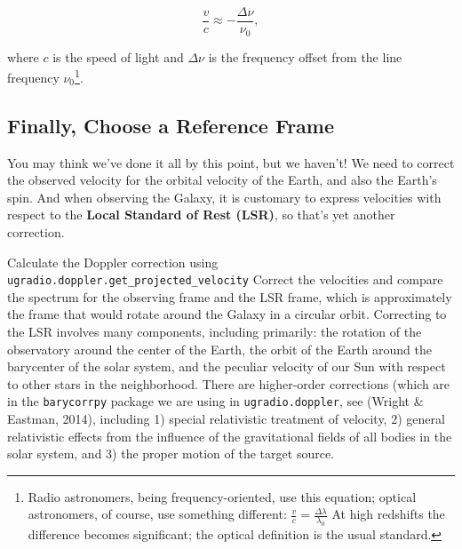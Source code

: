 \documentclass[11pt,preprint]{aastex}
\begin{document}
\begin{equation}
\frac{v}{c} \approx -\frac{\Delta \nu}{\nu_0},
\end{equation}

\noindent where $c$ is the speed of light and $\Delta \nu$ is the frequency
offset from the line frequency $\nu_0$\footnote{Radio astronomers, being
  frequency-oriented, use this equation; optical astronomers, of course,
  use something different: $\frac{v}{c} = \frac{\Delta \lambda}{\lambda_0}$
   At high redshifts the difference becomes significant;
  the optical definition is the usual standard.}. 

\subsection{Finally, Choose a Reference Frame}

\noindent
You may think we've done it all by this point, but we haven't! We need
to correct the observed velocity for the orbital velocity of the Earth,
and also the Earth's spin. And when observing the Galaxy, it is
customary to express velocities with respect to the {\bf Local Standard of
Rest (LSR)}, so that's yet another correction.

Calculate the Doppler correction using {\tt ugradio.doppler.get\_projected\_velocity} 
Correct the velocities and compare the spectrum for the observing frame
and the LSR frame, which is approximately the frame that would rotate
around the Galaxy in a circular orbit.  Correcting to the LSR involves many components,
including primarily: the rotation of the observatory around the center of the Earth, the
orbit of the Earth around the barycenter of the solar system, and the peculiar velocity
of our Sun with respect to other stars in the neighborhood.  There are higher-order
corrections (which are in the {\tt barycorrpy} package we are using in {\tt ugradio.doppler},
see (Wright \& Eastman, 2014), including 1) special relativistic treatment of velocity,
2) general relativistic effects from the influence of the gravitational fields of all bodies
in the solar system, and 3) the proper motion of the target source.
\end{document}
